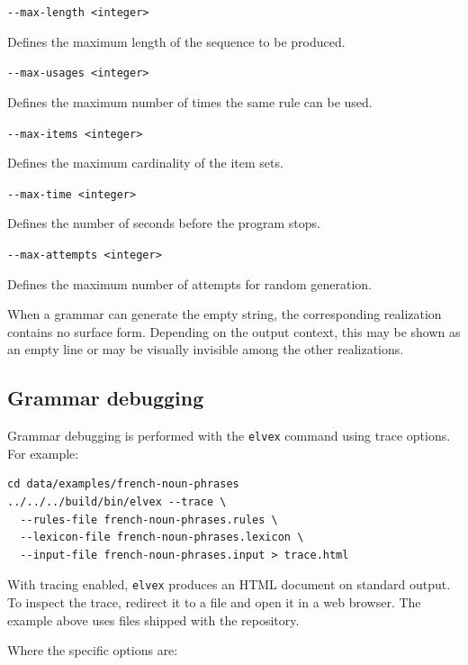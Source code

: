 \documentclass[11pt]{article}
\begin{document}
\begin{description}
	\item \verb#--max-length <integer>#

	      Defines the maximum length of the sequence to be produced.

	\item \verb#--max-usages <integer>#

	      Defines the maximum number of times the same rule can be used.

	\item \verb#--max-items <integer>#

	      Defines the maximum cardinality of the item sets.

	\item \verb#--max-time <integer>#

	      Defines the number of seconds before the program stops.

	\item \verb#--max-attempts <integer>#

	      Defines the maximum number of attempts for random generation.

\end{description}

When a grammar can generate the empty string, the corresponding realization
contains no surface form. Depending on the output context, this may be shown
as an empty line or may be visually invisible among the other realizations.


\subsection{Grammar debugging}

Grammar debugging is performed with the \texttt{elvex} command using
trace options. For example:

\begin{lstlisting}[frame=none, numbers=none]
cd data/examples/french-noun-phrases
../../../build/bin/elvex --trace \
  --rules-file french-noun-phrases.rules \
  --lexicon-file french-noun-phrases.lexicon \
  --input-file french-noun-phrases.input > trace.html
\end{lstlisting}

With tracing enabled, \texttt{elvex} produces an HTML document on
standard output. To inspect the trace, redirect it to a file and open it
in a web browser. The example above uses files shipped with the repository.

Where the specific options are:
\end{document}
